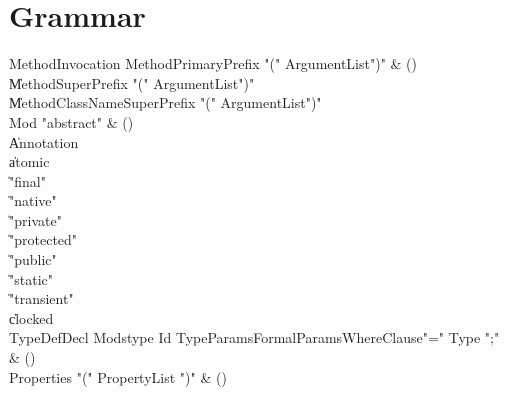 \chapter{Grammar}


\begin{bbgrammar}

 MethodInvocation  \label{prod:MethodInvocation}  \: MethodPrimaryPrefix \xcd"(" ArgumentList\opt \xcd")" & ()\\
    \| MethodSuperPrefix \xcd"(" ArgumentList\opt \xcd")"\\
    \| MethodClassNameSuperPrefix \xcd"(" ArgumentList\opt \xcd")"\\
 Mod  \label{prod:Mod}  \: \xcd"abstract" & ()\\
    \| Annotation\\
    \| atomic\\
    \| \xcd"final"\\
    \| \xcd"native"\\
    \| \xcd"private"\\
    \| \xcd"protected"\\
    \| \xcd"public"\\
    \| \xcd"static"\\
    \| \xcd"transient"\\
    \| clocked\\
 TypeDefDecl  \label{prod:TypeDefDecl}  \: Mods\opt type Id TypeParams\opt FormalParams\opt WhereClause\opt \xcd"=" Type \xcd";" & ()\\
 Properties  \label{prod:Properties}  \: \xcd"(" PropertyList \xcd")" & ()\\
\end{bbgrammar}

